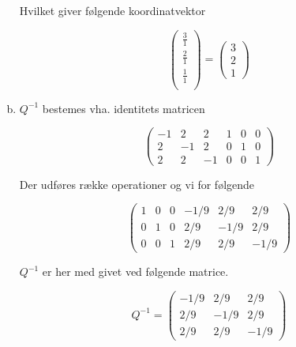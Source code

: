 \documentclass[12pt]{article}
\begin{document}
\begin{enumerate}[(a)]
Hvilket giver følgende koordinatvektor

$$
\left(\begin{array}{c}
\frac{3}{1}\\
\frac{2}{1}\\
\frac{1}{1}\\
\end{array}\right)
=
\left(\begin{array}{c}
3\\
2\\
1
\end{array}\right)
$$

\item
$Q^{-1}$ bestemes vha. identitets matricen

$$
\left(\begin{array}{ccc|ccc}
-1&2&2&1&0&0\\
2&-1&2&0&1&0\\
2&2&-1&0&0&1
\end{array}\right)
$$


Der udføres række operationer og vi for følgende

$$
\left(\begin{array}{ccc|ccc}
1&0&0&-1/9&2/9&2/9\\
0&1&0&2/9&-1/9&2/9\\
0&0&1&2/9&2/9&-1/9
\end{array}\right)
$$

$Q^{-1}$ er her med givet ved følgende matrice.

$$
Q^{-1} = \left(\begin{array}{ccc}
-1/9&2/9&2/9\\
2/9&-1/9&2/9\\
2/9&2/9&-1/9
\end{array}\right)
$$
\end{enumerate}
\end{document}
